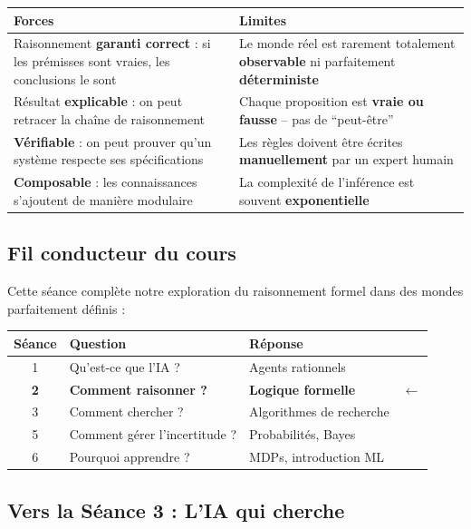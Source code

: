\documentclass[11pt,a4paper]{article}
\newcommand{\cmark}{\ding{51}}
\begin{document}
\begin{center}
\begin{tabular}{p{6.5cm}p{6.5cm}}
\toprule
\textbf{Forces} & \textbf{Limites} \\
\midrule
Raisonnement \textbf{garanti correct} : si les prémisses sont vraies, les conclusions le sont & Le monde réel est rarement totalement \textbf{observable} ni parfaitement \textbf{déterministe} \\
\addlinespace
Résultat \textbf{explicable} : on peut retracer la chaîne de raisonnement & Chaque proposition est \textbf{vraie ou fausse} -- pas de ``peut-être'' \\
\addlinespace
\textbf{Vérifiable} : on peut prouver qu'un système respecte ses spécifications & Les règles doivent être écrites \textbf{manuellement} par un expert humain \\
\addlinespace
\textbf{Composable} : les connaissances s'ajoutent de manière modulaire & La complexité de l'inférence est souvent \textbf{exponentielle} \\
\bottomrule
\end{tabular}
\end{center}

\subsection{Fil conducteur du cours}

Cette séance complète notre exploration du raisonnement formel dans des mondes parfaitement définis :

\begin{center}
\begin{tabular}{|c|l|l|c|}
\hline
\textbf{Séance} & \textbf{Question} & \textbf{Réponse} & \\
\hline
1 & Qu'est-ce que l'IA ? & Agents rationnels & \cmark \\
\textbf{2} & \textbf{Comment raisonner ?} & \textbf{Logique formelle} & $\leftarrow$ \\
3 & Comment chercher ? & Algorithmes de recherche & \\
5 & Comment gérer l'incertitude ? & Probabilités, Bayes & \\
6 & Pourquoi apprendre ? & MDPs, introduction ML & \\
\hline
\end{tabular}
\end{center}

\subsection{Vers la Séance 3 : L'IA qui cherche}
\end{document}

